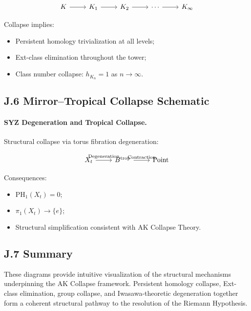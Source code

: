 \documentclass[11pt]{article}
\begin{document}
\[
\begin{tikzcd}[row sep=large]
K \arrow[r] & K_1 \arrow[r] & K_2 \arrow[r] & \cdots \arrow[r] & K_\infty
\end{tikzcd}
\]

Collapse implies:

\begin{itemize}
    \item Persistent homology trivialization at all levels;
    \item Ext-class elimination throughout the tower;
    \item Class number collapse: $h_{K_n} = 1$ as $n \to \infty$.
\end{itemize}

\subsection*{J.6 Mirror–Tropical Collapse Schematic}

\paragraph{SYZ Degeneration and Tropical Collapse.}  
Structural collapse via torus fibration degeneration:

\[
\begin{tikzcd}[row sep=large]
X_t \arrow[r, "\text{Degeneration}"] & B^{\mathrm{trop}} \arrow[r, "\text{Contraction}"] & \mathrm{Point}
\end{tikzcd}
\]

Consequences:

\begin{itemize}
    \item $\mathrm{PH}_1(X_t) = 0$;
    \item $\pi_1(X_t) \longrightarrow \{ e \}$;
    \item Structural simplification consistent with AK Collapse Theory.
\end{itemize}

\subsection*{J.7 Summary}

These diagrams provide intuitive visualization of the structural mechanisms underpinning the AK Collapse framework. Persistent homology collapse, Ext-class elimination, group collapse, and Iwasawa-theoretic degeneration together form a coherent structural pathway to the resolution of the Riemann Hypothesis.
\end{document}
